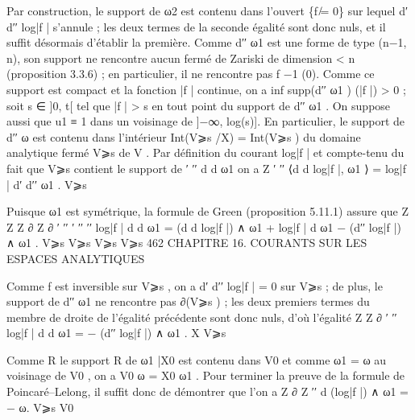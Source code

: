 \documentclass[
  10pt,
]{article}
\newenvironment{Shaded}{}{}
\newcommand{\NormalTok}[1]{#1}
\begin{document}
\begin{Shaded}
\begin{Highlighting}[]
\NormalTok{   Par construction, le support de ω2 est contenu dans l’ouvert \{f ̸= 0\} sur lequel}
\NormalTok{d′ d′′ log|f | s’annule ; les deux termes de la seconde égalité sont donc nuls, et il suffit}
\NormalTok{désormais d’établir la première.}
\NormalTok{   Comme d′′ ω1 est une forme de type (n−1, n), son support ne rencontre aucun fermé de}
\NormalTok{Zariski de dimension \textless{} n (proposition 3.3.6) ; en particulier, il ne rencontre pas f −1 (0).}
\NormalTok{Comme ce support est compact et la fonction |f | continue, on a inf supp(d′′ ω1 ) (|f |) \textgreater{} 0 ;}
\NormalTok{soit s ∈ ]0, t[ tel que |f | \textgreater{} s en tout point du support de d′′ ω1 . On suppose aussi que}
\NormalTok{u1 ≡ 1 dans un voisinage de ]−∞, log(s)]. En particulier, le support de d′′ ω est contenu}
\NormalTok{dans l’intérieur Int(V⩾s /X) = Int(V⩾s ) du domaine analytique fermé V⩾s de V .}
\NormalTok{   Par définition du courant log|f | et compte{-}tenu du fait que V⩾s contient le support de}
\NormalTok{ ′ ′′}
\NormalTok{d d ω1 on a}
\NormalTok{                                                   Z}
\NormalTok{                                ′ ′′}
\NormalTok{                              ⟨d d log|f |, ω1 ⟩ =   log|f | d′ d′′ ω1 .}
\NormalTok{                                                  V⩾s}

\NormalTok{Puisque ω1 est symétrique, la formule de Green (proposition 5.11.1) assure que}
\NormalTok{  Z                    Z                       Z ∂                Z ∂}
\NormalTok{               ′ ′′          ′ ′′                           ′′}
\NormalTok{      log|f | d d ω1 =    (d d log|f |) ∧ ω1 +     log|f | d ω1 −     (d′′ log|f |) ∧ ω1 .}
\NormalTok{    V⩾s                    V⩾s                          V⩾s               V⩾s}
\NormalTok{462               CHAPITRE 16. COURANTS SUR LES ESPACES ANALYTIQUES}

\NormalTok{Comme f est inversible sur V⩾s , on a d′ d′′ log|f | = 0 sur V⩾s ; de plus, le support}
\NormalTok{de d′′ ω1 ne rencontre pas ∂(V⩾s ) ; les deux premiers termes du membre de droite de}
\NormalTok{l’égalité précédente sont donc nuls, d’où l’égalité}
\NormalTok{                        Z                     Z ∂}
\NormalTok{                                    ′ ′′}
\NormalTok{                           log|f | d d ω1 = −       (d′′ log|f |) ∧ ω1 .}
\NormalTok{                           X                       V⩾s}

\NormalTok{  Comme}
\NormalTok{     R    le support}
\NormalTok{             R       de ω1 |X0 est contenu dans V0 et comme ω1 = ω au voisinage de V0 ,}
\NormalTok{on a V0 ω = X0 ω1 . Pour terminer la preuve de la formule de Poincaré–Lelong, il suffit}
\NormalTok{donc de démontrer que l’on a}
\NormalTok{                             Z ∂                       Z}
\NormalTok{                                   ′′}
\NormalTok{                                  d (log|f |) ∧ ω1 = −   ω.}
\NormalTok{                                   V⩾s                        V0}


\end{Highlighting}
\end{Shaded}
\end{document}
